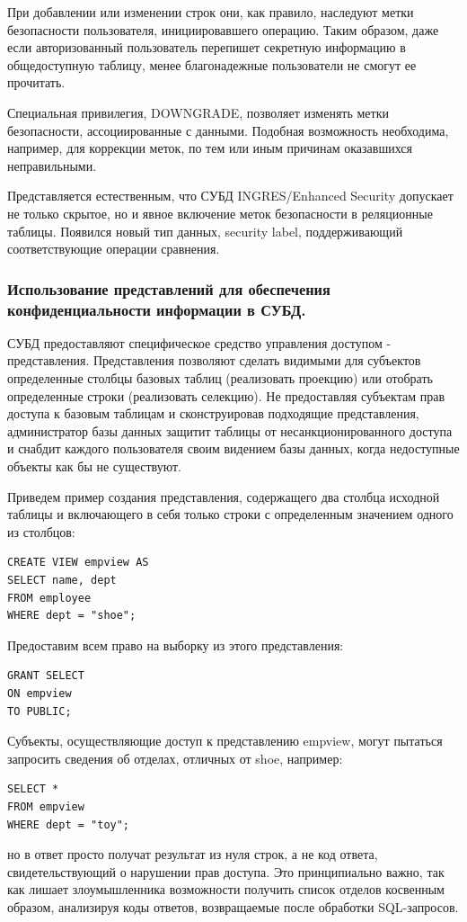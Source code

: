При добавлении или изменении строк они, как правило, наследуют метки безопасности пользователя, инициировавшего операцию. Таким образом, даже если авторизованный пользователь перепишет секретную информацию в общедоступную таблицу, менее благонадежные пользователи не смогут ее прочитать.

Специальная привилегия, DOWNGRADE, позволяет изменять метки безопасности, ассоциированные с данными. Подобная возможность необходима, например, для коррекции меток, по тем или иным причинам оказавшихся неправильными.

Представляется естественным, что СУБД INGRES/Enhanced Security допускает не только скрытое, но и явное включение меток безопасности в реляционные таблицы. Появился новый тип данных, security label, поддерживающий соответствующие операции сравнения.

\subsubsection{Использование представлений для обеспечения конфиденциальности
информации в СУБД.}

СУБД предоставляют специфическое средство управления доступом - представления. Представления позволяют сделать видимыми для субъектов определенные столбцы базовых таблиц (реализовать проекцию) или отобрать определенные строки (реализовать селекцию). Не предоставляя субъектам прав доступа к базовым таблицам и сконструировав подходящие представления, администратор базы данных защитит таблицы от несанкционированного доступа и снабдит каждого пользователя своим видением базы данных, когда недоступные объекты как бы не существуют.

Приведем пример создания представления, содержащего два столбца исходной таблицы и включающего в себя только строки с определенным значением одного из столбцов:
\begin{lstlisting}[]
CREATE VIEW empview AS
SELECT name, dept
FROM employee
WHERE dept = "shoe";
\end{lstlisting}
Предоставим всем право на выборку из этого представления:
\begin{lstlisting}[]
GRANT SELECT
ON empview
TO PUBLIC;
\end{lstlisting}
Субъекты, осуществляющие доступ к представлению empview, могут пытаться запросить сведения об отделах, отличных от shoe, например:
\begin{lstlisting}[]
SELECT *
FROM empview
WHERE dept = "toy";
\end{lstlisting}
но в ответ просто получат результат из нуля строк, а не код ответа, свидетельствующий о нарушении прав доступа. Это принципиально важно, так как лишает злоумышленника возможности получить список отделов косвенным образом, анализируя коды ответов, возвращаемые после обработки SQL-запросов.
